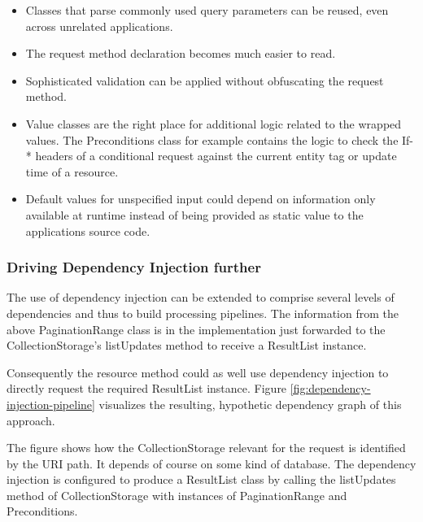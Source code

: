 \documentclass[11pt,a4paper,headsepline,twoside]{scrartcl}		%
\newcommand{\citeurl}[2]{\url{#1} (#2)}
\begin{document}
\begin{itemize}
\item Classes that parse commonly used query parameters can be reused, even across
  unrelated applications.
\item The request method declaration becomes much easier to read.
\item Sophisticated validation can be applied without obfuscating the request method.
\item Value classes are the right place for additional logic related to the
  wrapped values. The Preconditions class for example contains the logic to
  check the If-* headers of a conditional request against the current entity tag
  or update time of a resource.
\item Default values for unspecified input could depend on information only
  available at runtime instead of being provided as static value to the
  applications source code.
\end{itemize}



\subsubsection{Driving Dependency Injection further}

The use of dependency injection can be extended to comprise several levels of
dependencies and thus to build processing pipelines.  The information from the
above PaginationRange class is in the implementation just forwarded to the
CollectionStorage's listUpdates method to receive a ResultList instance.

Consequently the resource method could as well use dependency injection to
directly request the required ResultList
instance. Figure \ref{fig:dependency-injection-pipeline} visualizes the resulting,
hypothetic dependency graph of this approach.

The figure shows how the CollectionStorage relevant for the request is
identified by the URI path. It depends of course on some kind of database.  The
dependency injection is configured to produce a ResultList class by calling the
listUpdates method of CollectionStorage with instances of PaginationRange and
Preconditions.
\end{document}
